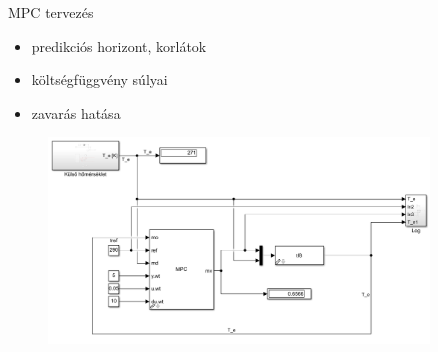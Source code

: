 \documentclass[14pt,handout]{beamer}
\begin{document}
\begin{frame}{MPC tervezés}

\begin{itemize}
	\item predikciós horizont, korlátok
	\item költségfüggvény súlyai
	\item zavarás hatása
\end{itemize}

\begin{figure}
	\centering
	\includegraphics[width=0.9\textwidth]{picture/3-simModel.PNG}	
\end{figure}

\end{frame}
\end{document}
